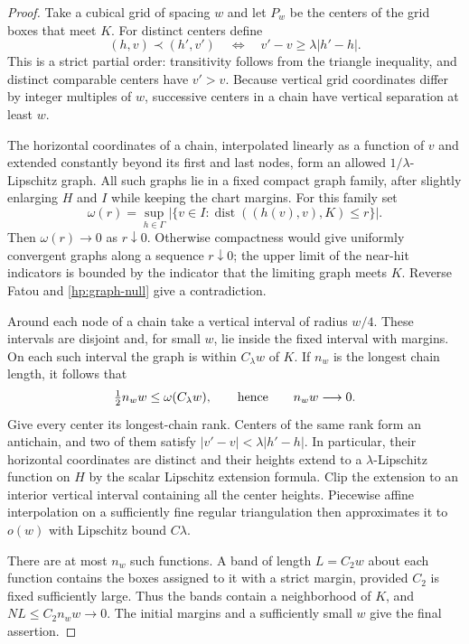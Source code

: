 \documentclass[11pt]{article}
\numberwithin{equation}{section}
\theoremstyle{definition}
\theoremstyle{remark}
\begin{document}
\begin{proof}
Take a cubical grid of spacing $w$ and let $P_w$ be the centers of
the grid boxes that meet $K$.  For distinct centers define
\[
 (h,v)\prec(h',v')\quad\Longleftrightarrow\quad
                         v'-v\ge\lambda|h'-h|.
\]
This is a strict partial order: transitivity follows from the
triangle inequality, and distinct comparable centers have $v'>v$.
Because vertical grid coordinates differ by integer multiples of
$w$, successive centers in a chain have vertical separation at least
$w$.

The horizontal coordinates of a chain, interpolated linearly as a
function of $v$ and extended constantly beyond its first and last
nodes, form an allowed $1/\lambda$-Lipschitz graph.  All such graphs
lie in a fixed compact graph family, after slightly enlarging $H$
and $I$ while keeping the chart margins.  For this family set
\[
 \omega(r)=\sup_{h\in\Gamma}
  \bigl|\{v\in I:\operatorname{dist}((h(v),v),K)\le r\}\bigr|.
\]
Then $\omega(r)\to0$ as $r\downarrow0$.  Otherwise compactness
would give uniformly convergent graphs along a sequence $r\downarrow0$;
the upper limit of the near-hit indicators is bounded by the
indicator that the limiting graph meets $K$.  Reverse Fatou and
\eqref{hp:graph-null} give a contradiction.

Around each node of a chain take a vertical interval of radius
$w/4$.  These intervals are disjoint and, for small $w$, lie inside
the fixed interval with margins.  On each such interval the graph
is within $C_\lambda w$ of $K$.  If $n_w$ is the longest chain
length, it follows that
\[
 \tfrac12 n_ww\le\omega(C_\lambda w),
 \qquad\hbox{hence}\qquad n_ww\longrightarrow0.
\]
Give every center its longest-chain rank.  Centers of the same rank
form an antichain, and two of them satisfy
$|v'-v|<\lambda|h'-h|$.  In particular, their horizontal coordinates
are distinct and their heights extend to a $\lambda$-Lipschitz
function on $H$ by the scalar Lipschitz extension formula.  Clip
the extension to an interior vertical interval containing all the
center heights.  Piecewise affine interpolation on a sufficiently
fine regular triangulation then approximates it to $o(w)$ with
Lipschitz bound $C\lambda$.

There are at most $n_w$ such functions.  A band of length $L=C_2w$
about each function contains the boxes assigned to it with a strict
margin, provided $C_2$ is fixed sufficiently large.  Thus the bands
contain a neighborhood of $K$, and
$NL\le C_2n_ww\to0$.  The initial margins and a sufficiently small
$w$ give the final assertion.
\end{proof}
\end{document}
